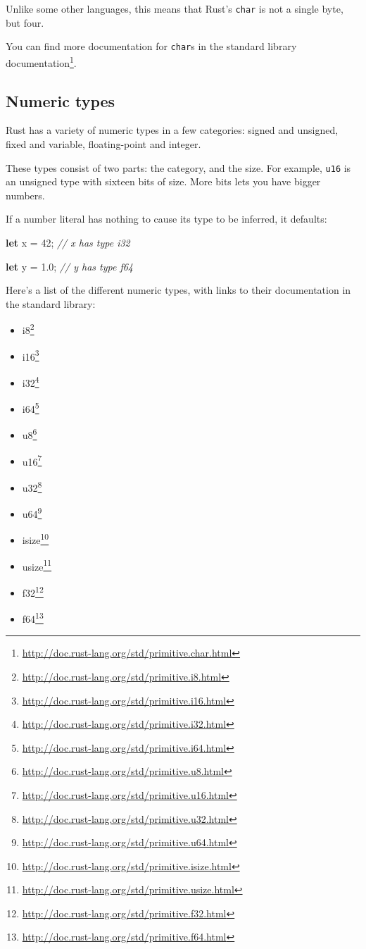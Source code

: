 \documentclass[a4paper,]{book}
\newenvironment{Shaded}{\begin{snugshade}}{\end{snugshade}}
\newcommand{\KeywordTok}[1]{\textcolor[rgb]{0.13,0.29,0.53}{\textbf{{#1}}}}
\newcommand{\DecValTok}[1]{\textcolor[rgb]{0.00,0.00,0.81}{{#1}}}
\newcommand{\CommentTok}[1]{\textcolor[rgb]{0.56,0.35,0.01}{\textit{{#1}}}}
\newcommand{\NormalTok}[1]{{#1}}
\renewcommand{\href}[2]{#2\footnote{\url{#1}}}
\providecommand{\tightlist}{%
  \setlength{\itemsep}{0pt}\setlength{\parskip}{0pt}}
\begin{document}
Unlike some other languages, this means that Rust's \texttt{char} is not
a single byte, but four.

You can find more documentation for \texttt{char}s
\href{http://doc.rust-lang.org/std/primitive.char.html}{in the standard
library documentation}.

\hypertarget{numeric-types}{\subsection{Numeric
types}\label{numeric-types}}

Rust has a variety of numeric types in a few categories: signed and
unsigned, fixed and variable, floating-point and integer.

These types consist of two parts: the category, and the size. For
example, \texttt{u16} is an unsigned type with sixteen bits of size.
More bits lets you have bigger numbers.

If a number literal has nothing to cause its type to be inferred, it
defaults:

\begin{Shaded}
\begin{Highlighting}[]
\KeywordTok{let} \NormalTok{x = }\DecValTok{42}\NormalTok{; }\CommentTok{// x has type i32}

\KeywordTok{let} \NormalTok{y = }\DecValTok{1.0}\NormalTok{; }\CommentTok{// y has type f64}
\end{Highlighting}
\end{Shaded}

Here's a list of the different numeric types, with links to their
documentation in the standard library:

\begin{itemize}
\tightlist
\item
  \href{http://doc.rust-lang.org/std/primitive.i8.html}{i8}
\item
  \href{http://doc.rust-lang.org/std/primitive.i16.html}{i16}
\item
  \href{http://doc.rust-lang.org/std/primitive.i32.html}{i32}
\item
  \href{http://doc.rust-lang.org/std/primitive.i64.html}{i64}
\item
  \href{http://doc.rust-lang.org/std/primitive.u8.html}{u8}
\item
  \href{http://doc.rust-lang.org/std/primitive.u16.html}{u16}
\item
  \href{http://doc.rust-lang.org/std/primitive.u32.html}{u32}
\item
  \href{http://doc.rust-lang.org/std/primitive.u64.html}{u64}
\item
  \href{http://doc.rust-lang.org/std/primitive.isize.html}{isize}
\item
  \href{http://doc.rust-lang.org/std/primitive.usize.html}{usize}
\item
  \href{http://doc.rust-lang.org/std/primitive.f32.html}{f32}
\item
  \href{http://doc.rust-lang.org/std/primitive.f64.html}{f64}
\end{itemize}
\end{document}
